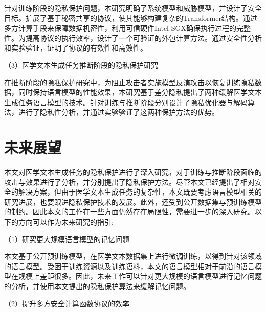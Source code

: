 针对训练阶段的隐私保护问题，本研究明确了系统模型和威胁模型，并设计了安全目标。扩展了基于秘密共享的协议，使其能够构建复杂的Transformer结构。通过多方计算手段来保障数据机密性，利用可信硬件Intel SGX确保执行过程的完整性。为提高协议的执行效率，设计了一个可验证的外包计算方法。通过安全性分析和实验验证，证明了协议的有效性和高效性。

（3）医学文本生成任务推断阶段的隐私保护研究


在推断阶段的隐私保护研究中，为阻止攻击者实施模型反演攻击以恢复训练隐私数据，同时保持语言模型的性能效果，本研究基于差分隐私提出了两种缓解医学文本生成任务语言模型的技术。针对训练与推断阶段分别设计了隐私优化器与解码算法，进行了隐私性分析，并通过实验验证了这两种保护方法的优势。


\section{未来展望}

本文对医学文本生成任务的隐私保护进行了深入研究，对于训练与推断阶段面临的攻击与效果进行了分析，并分别提出了隐私保护方法。尽管本文已经提出了相对安全的解决方案，但由于医学文本生成任务的复杂性，本文既要考虑语言模型相关的研究进展，也要跟进隐私保护技术的发展。此外，还受到公开数据集与预训练模型的制约。因此本文的工作在一些方面仍然存在局限性，需要进一步的深入研究。以下的方向可以作为未来研究的指引:

（1）研究更大规模语言模型的记忆问题

本文基于公开预训练模型，在医学文本数据集上进行微调训练，以得到针对该领域的语言模型。受困于训练资源以及训练语料，本文的语言模型相对于前沿的语言模型在规模上差距很多。因此，未来工作可以针对更大规模的语言模型进行记忆问题的分析，并使用本文提出的隐私保护算法来缓解记忆问题。

（2）提升多方安全计算函数协议的效率

